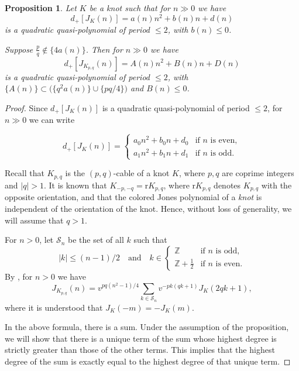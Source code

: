 \documentclass[11pt]{amsart}
\newtheorem{proposition}[theorem]{Proposition}
\theoremstyle{definition}
\newcommand{\K}{{K_{p, q}}}
\def\BZ{\mathbb Z}
\def\CS{\mathcal S}
\begin{document}
\begin{proposition}
\label{quasi}
Let $K$ be a knot such that for $n \gg 0$ we have
$$
d_+[J_K(n)]=a(n)n^2+b(n)n+d(n)
$$
is a quadratic quasi-polynomial of period $\le 2$, with $b(n) \le 0$. 

Suppose $\frac{p}{q} \notin \{4a(n)\}$. Then for $n \gg 0$ we have
$$d_+[J_{\K}(n)]=A(n)n^2+B(n)n+D(n)$$
is a quadratic quasi-polynomial of period $\le 2$, with $\{A(n)\} \subset \big( \{q^2a(n)\} \cup \{pq/4\} \big)$ and $B(n) \le 0$.
\end{proposition}
 


\begin{proof} 

Since $d_+[J_K(n)]$ is a quadratic quasi-polynomial of period $\le 2$, for $n \gg 0$ we can write

$$d_+[J_K(n)]=\begin{cases} 
a_0 n^2+b_0n+d_0 & \mbox{if } n \mbox{ is even},\\
a_1 n^2+b_1n+d_1 & \mbox{if } n \mbox{ is odd}.\end{cases}$$


 Recall that $K_{p,q}$ is the $(p,q)$-cable of a knot $K$, where $p,q$ are coprime integers and $|q|>1$. It is known that $K_{-p,-q}=\text{r}K_{p,q}$, where $\text{r}K_{p,q}$ denotes $\K$ with the opposite orientation, and that the colored Jones polynomial of a \textit{knot} is independent of the orientation of the knot. Hence, without loss of generality, we will assume that $q > 1$. 
 
 
 
 For $n>0$, let $\CS_n$ be the set of all $k$ such that 
 $$
 |k| \le (n-1)/2 \quad \text{and} \quad k \in \begin{cases} \BZ &\mbox{if } n \text{ is odd}, \\ 
 \BZ+\frac{1}{2} & \mbox{if } n \text{ is even}. \end{cases}
 $$
By \cite{Ve}, for $n>0$ we have
\begin{equation}
\label{cables}
J_{K_{p,q}}(n)= v^{pq(n^2-1)/4} \sum_{k \in \CS_n} v^{-pk(qk+1)} J_K(2qk+1),
\end{equation} 
where it is understood that $J_K(-m)=-J_K(m)$.

In the above formula, there is a sum. Under the assumption of the proposition, we will show that there is a unique term of the sum whose highest degree is strictly greater than those of the other terms. This implies that the highest degree of the sum is exactly equal to the highest degree of that unique term. 



\end{proof}
\end{document}
